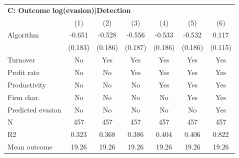 \begin{tabular}{lcccccc}
\midrule \multicolumn{7}{l}{\textbf{C: Outcome log(evasion)|Detection}} \\ \multicolumn{1}{l}{} & (1) & (2) & (3) & (4) & (5) & (6) \\ \midrule
Algorithm   &      -0.651\sym{***}&      -0.528\sym{***}&      -0.556\sym{***}&      -0.533\sym{***}&      -0.532\sym{***}&       0.117         \\
            &     (0.183)         &     (0.186)         &     (0.187)         &     (0.186)         &     (0.186)         &     (0.115)         \\
\midrule
Turnover    &          No         &         Yes         &         Yes         &         Yes         &         Yes         &         Yes         \\
Profit rate &          No         &          No         &         Yes         &         Yes         &         Yes         &         Yes         \\
Productivity&          No         &          No         &          No         &         Yes         &         Yes         &         Yes         \\
Firm char.  &          No         &          No         &          No         &          No         &         Yes         &         Yes         \\
Predicted evasion&          No         &          No         &          No         &          No         &          No         &         Yes         \\
N           &         457         &         457         &         457         &         457         &         457         &         457         \\
R2          &       0.323         &       0.368         &       0.386         &       0.404         &       0.406         &       0.822         \\
Mean outcome&       19.26         &       19.26         &       19.26         &       19.26         &       19.26         &       19.26         \\
\bottomrule \end{tabular}
